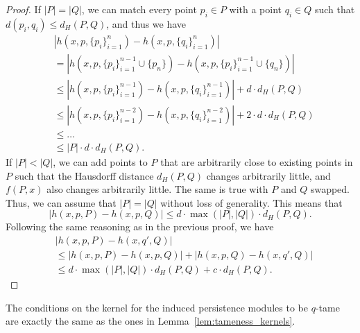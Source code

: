 \begin{proof}
    If $|P| = |Q|$, we can match every point $p_i \in P$ with a point
    $q_i \in Q$ such that $d(p_i, q_i) \leq d_H(P, Q)$, and thus we have
    \begin{align}
        & |h(x, p, \{p_i\}_{i = 1}^n) - h(x, p, \{q_i\}_{i = 1}^n)| \\
        & = |h(x, p, \{p_i\}_{i = 1}^{n-1} \cup \{p_n\}) - h(x, p, \{p_i\}_{i = 1}^{n-1} \cup \{q_n\})| \\
        & \leq |h(x, p, \{p_i\}_{i = 1}^{n-1}) - h(x, p, \{q_i\}_{i = 1}^{n-1})| + d \cdot d_H(P, Q) \\
        & \leq |h(x, p, \{p_i\}_{i = 1}^{n-2}) - h(x, p, \{q_i\}_{i = 1}^{n-2})| + 2 \cdot d \cdot d_H(P, Q) \\
        & \leq \ldots \\
        & \leq |P| \cdot d \cdot d_H(P, Q).
    \end{align}
    If $|P| < |Q|$, we can add points to $P$ that are arbitrarily close to
    existing points in $P$ such that the Hausdorff distance
    $d_H(P, Q)$ changes arbitrarily little, and $f(P, x)$ also changes
    arbitrarily little. The same is true with $P$ and $Q$ swapped. Thus, we can
    assume that $|P| = |Q|$ without loss of generality. This means that
    \begin{equation}
        |h(x, p, P) - h(x, p, Q)| \leq d \cdot \max(|P|, |Q|) \cdot d_H(P, Q).
    \end{equation}
    Following the same reasoning as in the previous proof, we have
    \begin{align}
        & |h(x, p, P) - h(x, q', Q)| \\
        & \leq |h(x, p, P) - h(x, p, Q)| + |h(x, p, Q) - h(x, q', Q)| \\
        & \leq d \cdot \max(|P|, |Q|) \cdot d_H(P, Q) + c \cdot d_H(P, Q).
    \end{align}
\end{proof}

The conditions on the kernel for the induced persistence modules to be
$q$-tame are exactly the same as the ones in Lemma~\ref{lem:tameness_kernels}.

